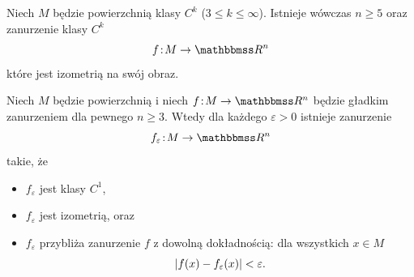 \begin{frame}
\begin{twierdzenie}
Niech $M$ będzie powierzchnią klasy $C^k$ ($3\leqslant k \leqslant\infty$). Istnieje wówczas $n\geqslant 5$ oraz  zanurzenie klasy $C^k$
\[f\colon M\to \R^n\] które jest izometrią na swój obraz.
\end{twierdzenie}
\end{frame}

\begin{frame}
\begin{twierdzenie}
Niech $M$ będzie powierzchnią i niech $f\colon M\to \R^n$ będzie gładkim zanurzeniem dla pewnego $n\geqslant 3$. Wtedy dla każdego $\varepsilon>0$ istnieje zanurzenie 
\[f_{\varepsilon}\colon M\to \R^n\]
takie, że
\begin{itemize}
\item $f_\varepsilon$ jest klasy $C^1$,
\item $f_\varepsilon$ jest izometrią, oraz
\item $f_\varepsilon$ przybliża zanurzenie $f$ z dowolną dokładnością: dla wszystkich $x\in M$
\[\left|f(x)-f_{\varepsilon}(x)\right|< \varepsilon.\]
\end{itemize}
\end{twierdzenie}
\end{frame}

